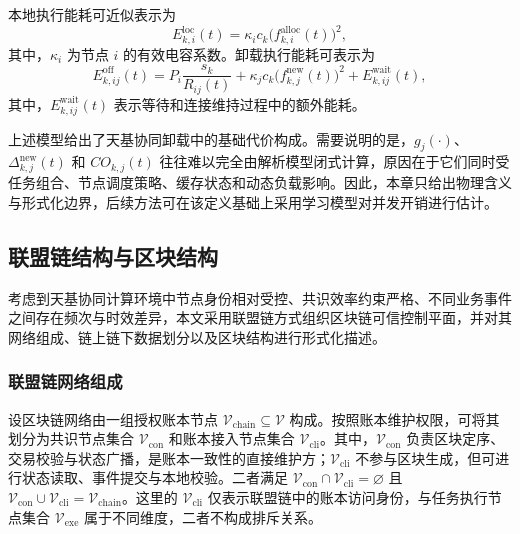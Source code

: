 本地执行能耗可近似表示为
\begin{equation}
    E_{k,i}^{\mathrm{loc}}(t)=\kappa_i c_k\big(f_{k,i}^{\mathrm{alloc}}(t)\big)^2,
    \label{eq:ch3_local_energy_unified}
\end{equation}
其中，$\kappa_i$ 为节点 $i$ 的有效电容系数。卸载执行能耗可表示为
\begin{equation}
    E_{k,ij}^{\mathrm{off}}(t)=P_i \frac{s_k}{R_{ij}(t)}+\kappa_j c_k\big(f_{k,j}^{\mathrm{new}}(t)\big)^2+E_{k,ij}^{\mathrm{wait}}(t),
    \label{eq:ch3_offload_energy_unified}
\end{equation}
其中，$E_{k,ij}^{\mathrm{wait}}(t)$ 表示等待和连接维持过程中的额外能耗。

上述模型给出了天基协同卸载中的基础代价构成。需要说明的是，$g_j(\cdot)$、$\Delta_{k,j}^{\mathrm{new}}(t)$ 和 $CO_{k,j}(t)$ 往往难以完全由解析模型闭式计算，原因在于它们同时受任务组合、节点调度策略、缓存状态和动态负载影响。因此，本章只给出物理含义与形式化边界，后续方法可在该定义基础上采用学习模型对并发开销进行估计。

\subsection{联盟链结构与区块结构}
\label{subsec:ch3_chain_structure}

考虑到天基协同计算环境中节点身份相对受控、共识效率约束严格、不同业务事件之间存在频次与时效差异，本文采用联盟链方式组织区块链可信控制平面，并对其网络组成、链上链下数据划分以及区块结构进行形式化描述。

\subsubsection{联盟链网络组成}

设区块链网络由一组授权账本节点 $\mathcal{V}_{\mathrm{chain}}\subseteq\mathcal{V}$ 构成。按照账本维护权限，可将其划分为共识节点集合 $\mathcal{V}_{\mathrm{con}}$ 和账本接入节点集合 $\mathcal{V}_{\mathrm{cli}}$。其中，$\mathcal{V}_{\mathrm{con}}$ 负责区块定序、交易校验与状态广播，是账本一致性的直接维护方；$\mathcal{V}_{\mathrm{cli}}$ 不参与区块生成，但可进行状态读取、事件提交与本地校验。二者满足 $\mathcal{V}_{\mathrm{con}}\cap\mathcal{V}_{\mathrm{cli}}=\varnothing$ 且 $\mathcal{V}_{\mathrm{con}}\cup\mathcal{V}_{\mathrm{cli}}=\mathcal{V}_{\mathrm{chain}}$。这里的 $\mathcal{V}_{\mathrm{cli}}$ 仅表示联盟链中的账本访问身份，与任务执行节点集合 $\mathcal{V}_{\mathrm{exe}}$ 属于不同维度，二者不构成排斥关系。

